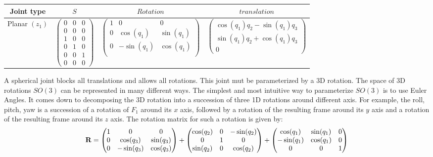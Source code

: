 \begin{tabular}{|c|c|c|c|}
  \hline
  Joint type & $S$ & $Rotation$ & $translation$ \\
  \hline
  Planar $(z_1)$
  &
  $\begin{pmatrix}
    0 & 0 & 0 \\ 0 & 0 & 0 \\ 1 & 0 & 0 \\ 0 & 1 & 0 \\ 0 & 0 & 1 \\ 0 & 0 & 0
  \end{pmatrix}$
  &
  $\begin{pmatrix}
    1 & 0 & 0 \\
    0 & \cos(q_1) & \sin(q_1) \\
    0 & -\sin(q_1) & \cos(q_1) \\
  \end{pmatrix}$
  &
  $\begin{pmatrix}
    \cos(q_1)q_2 - \sin(q_1)q_3 \\ \sin(q_1)q_2 + \cos(q_1)q_3 \\ 0
  \end{pmatrix}$
  \\
  \hline
\end{tabular}

A spherical joint blocks all translations and allows all rotations. This joint mut be parameterized by a 3D rotation. The space of 3D rotations $SO(3)$ can be represented in many different ways.
The simplest and most intuitive way to parameterize $SO(3)$ is to use Euler Angles.
It comes down to decomposing the 3D rotation into a succession of three 1D rotations around different axis.
For example, the roll, pitch, yaw is a succession of a rotation of $F_1$ around its $x$ axis, followed by a rotation of the resulting frame around its $y$ axis and a rotation of the resulting frame around its $z$ axis.
The rotation matrix for such a rotation is given by:
\begin{equation}
  \bf{R} =
  \begin{pmatrix}
    1 & 0 & 0 \\
    0 & \cos(q_3) & \sin(q_3) \\
    0 & -\sin(q_3) & \cos(q_3) \\
  \end{pmatrix}
  +
  \begin{pmatrix}
    \cos(q_2) & 0 & -\sin(q_2) \\
    0 & 1 & 0 \\
    \sin(q_2) & 0 & \cos(q_2) \\
  \end{pmatrix}
  +
  \begin{pmatrix}
    \cos(q_1) & \sin(q_1) & 0 \\
    -\sin(q_1) & \cos(q_1) & 0 \\
    0 & 0 & 1
  \end{pmatrix}
\end{equation}


